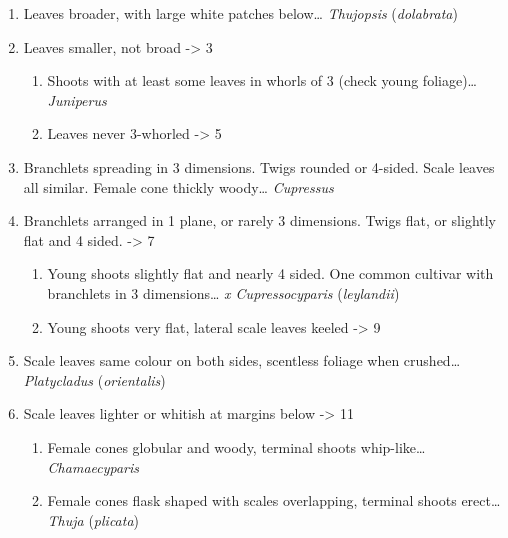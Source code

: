 \documentclass[openany]{book}
\providecommand{\tightlist}{%
  \setlength{\itemsep}{0pt}\setlength{\parskip}{0pt}}
\begin{document}
\begin{enumerate}
\def\labelenumi{\arabic{enumi}.}
\tightlist
\item
  Leaves broader, with large white patches below\ldots{} \emph{Thujopsis} (\emph{dolabrata})
\item
  Leaves smaller, not broad -\textgreater{} 3

  \begin{enumerate}
  \def\labelenumii{\arabic{enumii}.}
  \setcounter{enumii}{2}
  \tightlist
  \item
    Shoots with at least some leaves in whorls of 3 (check young foliage)\ldots{} \emph{Juniperus}
  \item
    Leaves never 3-whorled -\textgreater{} 5
  \end{enumerate}
\item
  Branchlets spreading in 3 dimensions. Twigs rounded or 4-sided. Scale leaves all similar. Female cone thickly woody\ldots{} \emph{Cupressus}
\item
  Branchlets arranged in 1 plane, or rarely 3 dimensions. Twigs flat, or slightly flat and 4 sided. -\textgreater{} 7

  \begin{enumerate}
  \def\labelenumii{\arabic{enumii}.}
  \setcounter{enumii}{6}
  \tightlist
  \item
    Young shoots slightly flat and nearly 4 sided. One common cultivar with branchlets in 3 dimensions\ldots{} \emph{x Cupressocyparis} (\emph{leylandii})
  \item
    Young shoots very flat, lateral scale leaves keeled -\textgreater{} 9
  \end{enumerate}
\item
  Scale leaves same colour on both sides, scentless foliage when crushed\ldots{} \emph{Platycladus} (\emph{orientalis})
\item
  Scale leaves lighter or whitish at margins below -\textgreater{} 11

  \begin{enumerate}
  \def\labelenumii{\arabic{enumii}.}
  \setcounter{enumii}{10}
  \tightlist
  \item
    Female cones globular and woody, terminal shoots whip-like\ldots{} \emph{Chamaecyparis}
  \item
    Female cones flask shaped with scales overlapping, terminal shoots erect\ldots{} \emph{Thuja} (\emph{plicata})
  \end{enumerate}
\end{enumerate}
\end{document}
